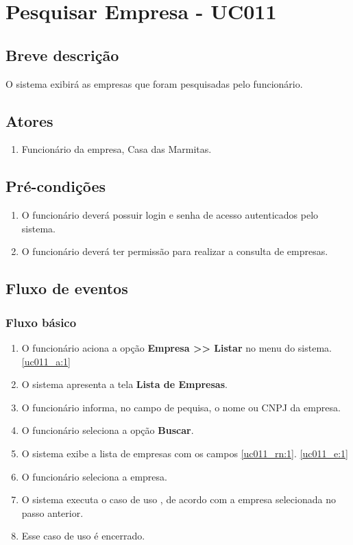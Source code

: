 \chapter{Pesquisar Empresa - UC011} \label{uc011}

\section{Breve descrição}

O sistema exibirá as empresas que foram pesquisadas pelo funcionário.

\section{Atores}

\begin{enumerate}
	\item Funcionário da empresa, Casa das Marmitas.
\end{enumerate}

\section{Pré-condições}

\begin{enumerate}
	\item O funcionário deverá possuir login e senha de acesso autenticados pelo sistema.
	\item O funcionário deverá ter permissão para realizar a consulta de empresas.
\end{enumerate}

\section{Fluxo de eventos}

\subsection{Fluxo básico}

\begin{enumerate}[label=P\arabic*]
	\item O funcionário aciona a opção \textbf{Empresa >> Listar} no menu do sistema. \label{uc011_p:1}\ref{uc011_a:1}
	\item O sistema apresenta a tela \textbf{Lista de Empresas}.	
	\item O funcionário informa, no campo de pequisa, o nome ou CNPJ da empresa. \label{uc011_p:3}
	\item O funcionário seleciona a opção \textbf{Buscar}.
	\item O sistema exibe a lista de empresas com os campos \ref{uc011_rn:1}. \ref{uc011_e:1}
	\item O funcionário seleciona a empresa.
	\item O sistema executa o caso de uso , de acordo com a empresa selecionada no passo anterior.
	\item Esse caso de uso é encerrado.
\end{enumerate}

